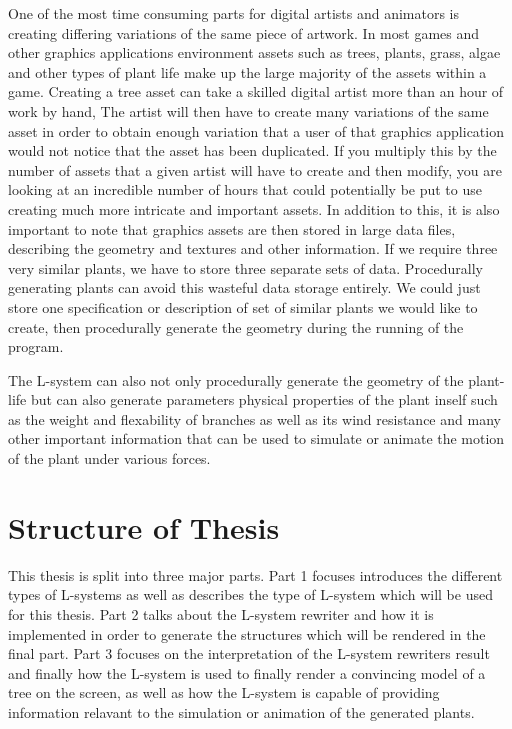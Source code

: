 \begin{flushleft}

One of the most time consuming parts for digital artists and animators is creating differing variations of the same piece of artwork. In most games and other graphics applications environment assets such as trees, plants, grass, algae and other types of plant life make up the large majority of the assets within a game. Creating a tree asset can take a skilled digital artist more than an hour of work by hand, The artist will then have to create many variations of the same asset in order to obtain enough variation that a user of that graphics application would not notice that the asset has been duplicated. If you multiply this by the number of assets that a given artist will have to create and then modify, you are looking at an incredible number of hours that could potentially be put to use creating much more intricate and important assets. In addition to this, it is also important to note that graphics assets are then stored in large data files, describing the geometry and textures and other information. If we require three very similar plants, we have to store three separate sets of data. Procedurally generating plants can avoid this wasteful data storage entirely. We could just store one specification or description of set of similar plants we would like to create, then procedurally generate the geometry during the running of the program. \\

\vspace{5mm} 

The L-system can also not only procedurally generate the geometry of the plant-life but can also generate parameters physical properties of the plant inself such as the weight and flexability of branches as well as its wind resistance and many other important information that can be used to simulate or animate the motion of the plant under various forces. \\

\end{flushleft}

\section{Structure of Thesis}

\begin{flushleft}

This thesis is split into three major parts. Part 1 focuses introduces the different types of L-systems as well as describes the type of L-system which will be used for this thesis. Part 2 talks about the L-system rewriter and how it is implemented in order to generate the structures which will be rendered in the final part. Part 3 focuses on the interpretation of the L-system rewriters result and finally how the L-system is used to finally render a convincing model of a tree on the screen, as well as how the L-system is capable of providing information relavant to the simulation or animation of the generated plants.

\end{flushleft}




